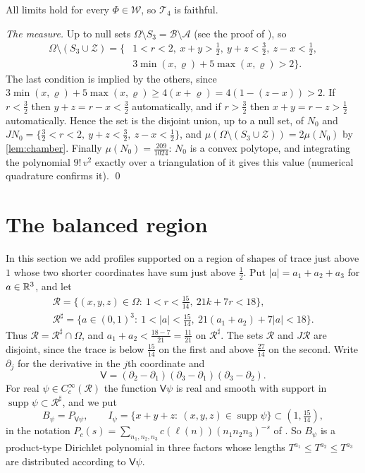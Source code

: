 \documentclass[11pt,colorlinks]{charlie}
\newcommand{\Om}{\Omega}
\begin{document}
All limits hold for every $\Phi\in\mathcal W$, so $\mathcal T_4$ is faithful.

\emph{The measure.} Up to null sets $\Om\setminus S_3=\mathcal B\setminus\mathcal A$ (see the proof of ), so
\[
 \begin{split}
 \Om\setminus(S_3\cup\mathcal Z)=\big\{&1<r<2,\ x+y>\tfrac12,\ y+z<\tfrac32,\ z-x<\tfrac12,\\
 &3\min(x,\varrho)+5\max(x,\varrho)>2\big\}.
 \end{split}
\]
The last condition is implied by the others, since $3\min(x,\varrho)+5\max(x,\varrho)\ge4(x+\varrho)=4(1-(z-x))>2$. If $r<\frac32$ then $y+z=r-x<\frac32$ automatically, and if $r>\frac32$ then $x+y=r-z>\frac12$ automatically. Hence the set is the disjoint union, up to a null set, of $N_0$ and $JN_0=\{\frac32<r<2,\ y+z<\frac32,\ z-x<\frac12\}$, and $\mu(\Om\setminus(S_3\cup\mathcal Z))=2\mu(N_0)$ by \cref{lem:chamber}. Finally $\mu(N_0)=\frac{209}{1024}$: $N_0$ is a convex polytope, and integrating the polynomial $9!\,v^2$ exactly over a triangulation of it gives this value (numerical quadrature confirms it). \qed

\section{The balanced region}\label{sec:balanced}

In this section we add profiles supported on a region of shapes of trace just above $1$ whose two shorter coordinates have sum just above $\frac12$. Put $|a|=a_1+a_2+a_3$ for $a\in\mathbb{R}^3$, and let
\begin{gather*}
 \mathcal R=\{(x,y,z)\in\Om:\ 1<r<\tfrac{15}{14},\ 21k+7r<18\},\\
 \mathcal R^\sharp=\{a\in(0,1)^3:\ 1<|a|<\tfrac{15}{14},\ 21(a_1+a_2)+7|a|<18\}.
\end{gather*}
Thus $\mathcal R=\mathcal R^\sharp\cap\Om$, and $a_1+a_2<\frac{18-7}{21}=\frac{11}{21}$ on $\mathcal R^\sharp$. The sets $\mathcal R$ and $J\mathcal R$ are disjoint, since the trace is below $\frac{15}{14}$ on the first and above $\frac{27}{14}$ on the second. Write $\partial_j$ for the derivative in the $j$th coordinate and
\[
 \mathsf V=(\partial_2-\partial_1)(\partial_3-\partial_1)(\partial_3-\partial_2).
\]
For real $\psi\in C_c^\infty(\mathcal R)$ the function $\mathsf V\psi$ is real and smooth with support in $\operatorname{supp}\psi\subset\mathcal R^\sharp$, and we put
\[
 B_\psi=P_{\mathsf V\psi},\qquad I_\psi=\{x+y+z:\ (x,y,z)\in\operatorname{supp}\psi\}\subset(1,\tfrac{15}{14}),
\]
in the notation $P_c(s)=\sum_{n_1,n_2,n_3}c(\ell(n))(n_1n_2n_3)^{-s}$ of . So $B_\psi$ is a product-type Dirichlet polynomial in three factors whose lengths $T^{a_1}\le T^{a_2}\le T^{a_3}$ are distributed according to $\mathsf V\psi$.
\end{document}
